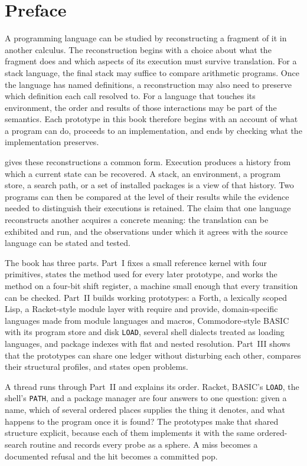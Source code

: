 \chapter*{Preface}

A programming language can be studied by reconstructing a fragment of it in another calculus. The reconstruction begins with a choice about what the fragment does and which aspects of its execution must survive translation. For a stack language, the final stack may suffice to compare arithmetic programs. Once the language has named definitions, a reconstruction may also need to preserve which definition each call resolved to. For a language that touches its environment, the order and results of those interactions may be part of the semantics. Each prototype in this book therefore begins with an account of what a program can do, proceeds to an implementation, and ends by checking what the implementation preserves.

\SP{} gives these reconstructions a common form. Execution produces a history from which a current state can be recovered. A stack, an environment, a program store, a search path, or a set of installed packages is a view of that history. Two programs can then be compared at the level of their results while the evidence needed to distinguish their executions is retained. The claim that one language reconstructs another acquires a concrete meaning: the translation can be exhibited and run, and the observations under which it agrees with the source language can be stated and tested.

The book has three parts. Part~I fixes a small reference kernel with four primitives, states the method used for every later prototype, and works the method on a four-bit shift register, a machine small enough that every transition can be checked. Part~II builds working prototypes: a Forth, a lexically scoped Lisp, a Racket-style module layer with require and provide, domain-specific languages made from module languages and macros, Commodore-style BASIC with its program store and disk \texttt{LOAD}, several shell dialects treated as loading languages, and package indexes with flat and nested resolution. Part~III shows that the prototypes can share one ledger without disturbing each other, compares their structural profiles, and states open problems.

A thread runs through Part~II and explains its order. Racket, BASIC's \texttt{LOAD}, the shell's \texttt{PATH}, and a package manager are four answers to one question: given a name, which of several ordered places supplies the thing it denotes, and what happens to the program once it is found? The prototypes make that shared structure explicit, because each of them implements it with the same ordered-search routine and records every probe as a sphere. A miss becomes a documented refusal and the hit becomes a committed pop.

